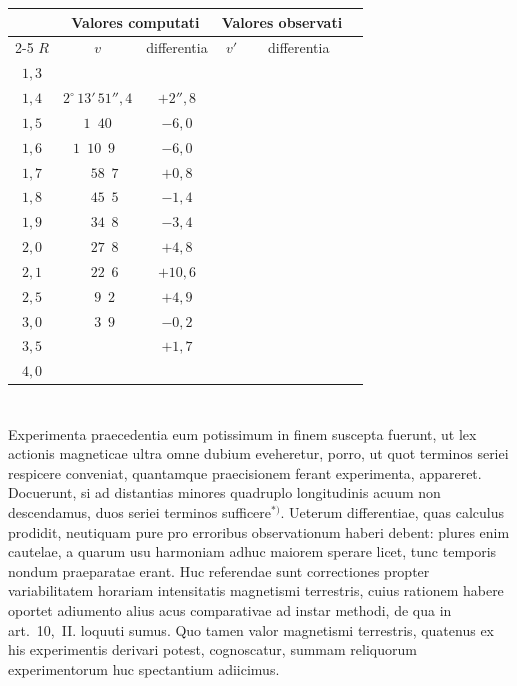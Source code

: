 \documentclass[fontsize=11pt,paper=a4,twoside,openany]{scrbook}
\begin{document}
\begin{center}
\small
\begin{tabular}{|c|c|c|c|c|c|}
\hline
& \multicolumn{2}{c|}{Valores computati} & \multicolumn{2}{c|}{Valores observati} & \\
\cline{2-5}
$R$ & $v$ & differentia & $v'$ & differentia & \\
\hline
$1{,}3$ & & & & & \\
$1{,}4$ & $2^\circ\,13'\,51''{,}4$ & $+2''{,}8$ & & & \\
$1{,}5$ & $1\phantom{^\circ}\,40$ & $-6{,}0$ & & & \\
$1{,}6$ & $1\phantom{^\circ}\,10\phantom{'\,}9\phantom{''}$ & $-6{,}0$ & & & \\
$1{,}7$ & $\phantom{0^\circ}\,58\phantom{'\,}7$ & $+0{,}8$ & & & \\
$1{,}8$ & $\phantom{0^\circ}\,45\phantom{'\,}5$ & $-1{,}4$ & & & \\
$1{,}9$ & $\phantom{0^\circ}\,34\phantom{'\,}8$ & $-3{,}4$ & & & \\
$2{,}0$ & $\phantom{0^\circ}\,27\phantom{'\,}8$ & $+4{,}8$ & & & \\
$2{,}1$ & $\phantom{0^\circ}\,22\phantom{'\,}6$ & $+10{,}6$ & & & \\
$2{,}5$ & $\phantom{0^\circ}\,9\phantom{'\,}2$ & $+4{,}9$ & & & \\
$3{,}0$ & $\phantom{0^\circ}\,3\phantom{'\,}9$ & $-0{,}2$ & & & \\
$3{,}5$ & & $+1{,}7$ & & & \\
$4{,}0$ & & & & & \\
\hline
\end{tabular}
\end{center}

\section{}

Experimenta praecedentia eum potissimum in finem suscepta fuerunt, ut lex actionis magneticae ultra omne dubium eveheretur, porro, ut quot terminos seriei respicere conveniat, quantamque praecisionem ferant experimenta, appareret. Docuerunt, si ad distantias minores quadruplo longitudinis acuum non descendamus, duos seriei terminos sufficere$^{*)}$. Ueterum differentiae, quas calculus prodidit, neutiquam pure pro erroribus observationum haberi debent: plures enim cautelae, a quarum usu harmoniam adhuc maiorem sperare licet, tunc temporis nondum praeparatae erant. Huc referendae sunt correctiones propter variabilitatem horariam intensitatis magnetismi terrestris, cuius rationem habere oportet adiumento alius acus comparativae ad instar methodi, de qua in art.~10,~II. loquuti sumus. Quo tamen valor magnetismi terrestris, quatenus ex his experimentis derivari potest, cognoscatur, summam reliquorum experimentorum huc spectantium adiicimus.
\end{document}
